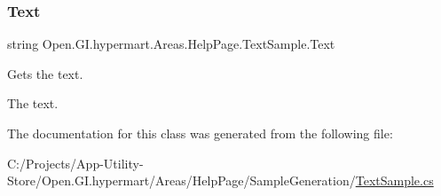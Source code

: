 \subsubsection{\texorpdfstring{Text}{Text}}
{\footnotesize\ttfamily string Open.\+G\+I.\+hypermart.\+Areas.\+Help\+Page.\+Text\+Sample.\+Text\hspace{0.3cm}{\ttfamily [get]}}



Gets the text. 

The text. 

The documentation for this class was generated from the following file\+:\begin{DoxyCompactItemize}
\item 
C\+:/\+Projects/\+App-\/\+Utility-\/\+Store/\+Open.\+G\+I.\+hypermart/\+Areas/\+Help\+Page/\+Sample\+Generation/\hyperlink{_text_sample_8cs}{Text\+Sample.\+cs}\end{DoxyCompactItemize}
